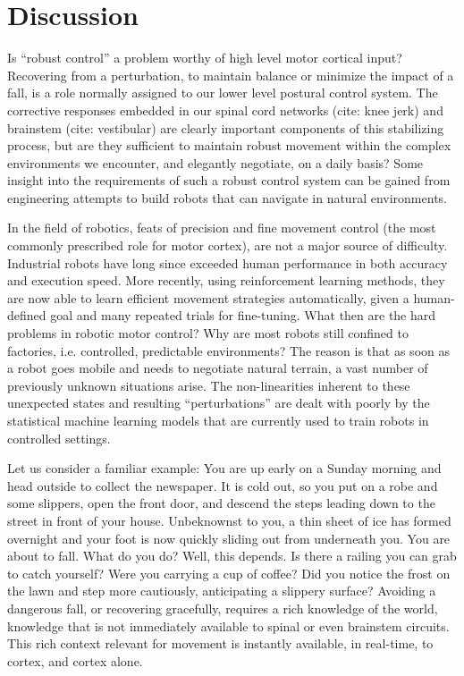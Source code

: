 \section{Discussion}

Is ``robust control'' a problem worthy of high level motor cortical input? Recovering from a perturbation, to maintain balance or minimize the impact of a fall, is a role normally assigned to our lower level postural control system. The corrective responses embedded in our spinal cord networks (cite: knee jerk) and brainstem (cite: vestibular) are clearly important components of this stabilizing process, but are they sufficient to maintain robust movement within the complex environments we encounter, and elegantly negotiate, on a daily basis? Some insight into the requirements of such a robust control system can be gained from engineering attempts to build robots that can navigate in natural environments.

In the field of robotics, feats of precision and fine movement control (the most commonly prescribed role for motor cortex), are not a major source of difficulty. Industrial robots have long since exceeded human performance in both accuracy and execution speed. More recently, using reinforcement learning methods, they are now able to learn efficient movement strategies automatically, given a human-defined goal and many repeated trials for fine-tuning. What then are the hard problems in robotic motor control? Why are most robots still confined to factories, i.e. controlled, predictable environments? The reason is that as soon as a robot goes mobile and needs to negotiate natural terrain, a vast number of previously unknown situations arise. The non-linearities inherent to these unexpected states and resulting ``perturbations'' are dealt with poorly by the statistical machine learning models that are currently used to train robots in controlled settings.

Let us consider a familiar example: You are up early on a Sunday morning and head outside to collect the newspaper. It is cold out, so you put on a robe and some slippers, open the front door, and descend the steps leading down to the street in front of your house. Unbeknownst to you, a thin sheet of ice has formed overnight and your foot is now quickly sliding out from underneath you. You are about to fall. What do you do? Well, this depends. Is there a railing you can grab to catch yourself? Were you carrying a cup of coffee? Did you notice the frost on the lawn and step more cautiously, anticipating a slippery surface? Avoiding a dangerous fall, or recovering gracefully, requires a rich knowledge of the world, knowledge that is not immediately available to spinal or even brainstem circuits. This rich context relevant for movement is instantly available, in real-time, to cortex, and cortex alone.


